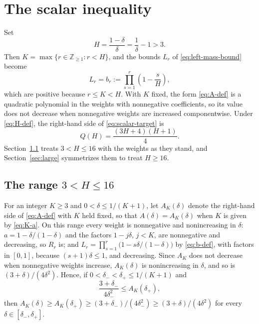 \documentclass[ECP]{ejpecp}
\begin{document}
\section{The scalar inequality}
\label{sec:scalar}

Set
\begin{equation}\label{eq:H-def}
  H=\frac{1-\delta}{\delta}=\frac1\delta-1>3.
\end{equation}
Then $K=\max\{r\in\mathbb Z_{\geq1}:r<H\}$, and the bounds $L_r$ of
\eqref{eq:left-mass-bound} become
\begin{equation}\label{eq:b-def}
  L_r=b_r:=\prod_{s=1}^r\left(1-\frac{s}{H}\right),
\end{equation}
which are positive because $r\leq K<H$. With $K$ fixed, the form
\eqref{eq:A-def} is a quadratic polynomial in the weights with nonnegative
coefficients, so its value does not decrease when nonnegative weights are
increased componentwise.
Under \eqref{eq:H-def}, the right-hand side of \eqref{eq:scalar-target} is
\begin{equation}\label{eq:Q-def}
  Q(H)=\frac{(3H+4)(H+1)}4.
\end{equation}
Section~\ref{sec:compact} treats $3<H\leq16$ with the weights as they stand,
and Section~\ref{sec:large} symmetrizes them to treat $H\geq16$.

\subsection{The range \texorpdfstring{$3<H\leq16$}{3 < H <= 16}}
\label{sec:compact}

For an integer $K\geq3$ and $0<\delta\leq1/(K+1)$, let $A_K(\delta)$ denote
the right-hand side of \eqref{eq:A-def} with $K$ held fixed, so that
$A(\delta)=A_K(\delta)$ when $K$ is given by \eqref{eq:K-a}. On this range
every weight is nonnegative and nonincreasing in $\delta$: $a=1-\delta/(1-\delta)$
and the factors $1-j\delta$, $j<K$, are nonnegative and decreasing, so $R_r$
is; and $L_r=\prod_{s=1}^r\bigl(1-s\delta/(1-\delta)\bigr)$ by
\eqref{eq:b-def}, with factors in $[0,1]$, because $(s+1)\delta\leq1$, and
decreasing. Since $A_K$ does not decrease when nonnegative weights increase, $A_K(\delta)$
is nonincreasing in $\delta$, and so is $(3+\delta)/(4\delta^2)$. Hence, if
$0<\delta_-<\delta_+\leq1/(K+1)$ and
\begin{equation}\label{eq:endpoint-check}
  \frac{3+\delta_-}{4\delta_-^2}\leq A_K(\delta_+),
\end{equation}
then $A_K(\delta)\geq A_K(\delta_+)\geq(3+\delta_-)/(4\delta_-^2)
\geq(3+\delta)/(4\delta^2)$ for every $\delta\in[\delta_-,\delta_+]$.
\end{document}
